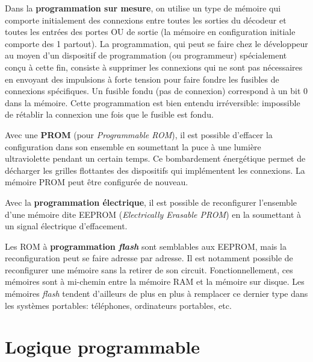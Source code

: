 \documentclass[letter, oneside]{book}
\begin{document}
\begin{enumerate}
Dans la \textbf{programmation sur mesure}, on utilise un type de mémoire qui
comporte initialement des connexions entre toutes les sorties du
décodeur et toutes les entrées des portes OU de sortie (la mémoire en
configuration initiale comporte des 1 partout). La programmation, qui
peut se faire chez le développeur au moyen d'un dispositif de
programmation (ou programmeur) spécialement conçu à cette fin,
consiste à supprimer les connexions qui ne sont pas nécessaires en
envoyant des impulsions à forte tension pour faire fondre les fusibles
de connexions spécifiques. Un fusible fondu (pas de connexion)
correspond à un bit 0 dans la mémoire. Cette programmation est bien
entendu irréversible: impossible de rétablir la connexion une fois que
le fusible est fondu.

Avec une \textbf{PROM} (pour \emph{Programmable ROM}), il est possible d'effacer la
configuration dans son ensemble en soumettant la puce à une lumière
ultraviolette pendant un certain temps. Ce bombardement énergétique
permet de décharger les grilles flottantes des dispositifs qui
implémentent les connexions. La mémoire PROM peut être configurée de
nouveau.

Avec la \textbf{programmation électrique}, il est possible de reconfigurer
l'ensemble d'une mémoire dite EEPROM (\emph{Electrically Erasable PROM})
en la soumettant à un signal électrique d'effacement. 

Les ROM à \textbf{programmation \emph{flash}} sont semblables aux EEPROM, mais la
reconfiguration peut se faire adresse par adresse.  Il est notamment
possible de reconfigurer une mémoire sans la retirer de son circuit.
Fonctionnellement, ces mémoires sont à mi-chemin entre la mémoire RAM
et la mémoire sur disque. Les mémoires \emph{flash} tendent d'ailleurs de
plus en plus à remplacer ce dernier type dans les systèmes portables:
téléphones, ordinateurs portables, etc.
\end{enumerate}

\chapter{Logique programmable}
\label{sec:org895a6ae}
\end{document}
